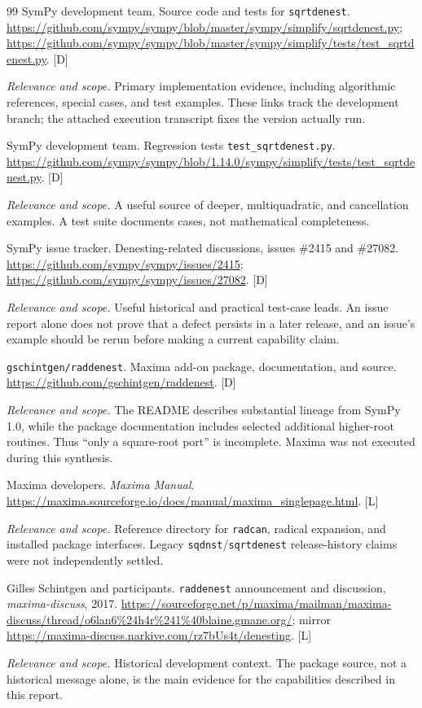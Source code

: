 \documentclass[11pt,oneside]{article}
\numberwithin{equation}{section}
\theoremstyle{definition}
\theoremstyle{remark}
\newcommand{\status}[1]{\textsf{\small[#1]}}
\newcommand{\entrynote}[1]{\par\smallskip\noindent\emph{Relevance and scope.} #1}
\begin{document}
\begin{thebibliography}{99}
SymPy development team. Source code and tests for \texttt{sqrtdenest}. \url{https://github.com/sympy/sympy/blob/master/sympy/simplify/sqrtdenest.py}; \url{https://github.com/sympy/sympy/blob/master/sympy/simplify/tests/test_sqrtdenest.py}. \status{D}
\entrynote{Primary implementation evidence, including algorithmic references, special cases, and test examples. These links track the development branch; the attached execution transcript fixes the version actually run.}

SymPy development team. Regression tests \texttt{test\_sqrtdenest.py}. \url{https://github.com/sympy/sympy/blob/1.14.0/sympy/simplify/tests/test_sqrtdenest.py}. \status{D}
\entrynote{A useful source of deeper, multiquadratic, and cancellation examples. A test suite documents cases, not mathematical completeness.}

SymPy issue tracker. Denesting-related discussions, issues \#2415 and \#27082. \url{https://github.com/sympy/sympy/issues/2415}; \url{https://github.com/sympy/sympy/issues/27082}. \status{D}
\entrynote{Useful historical and practical test-case leads. An issue report alone does not prove that a defect persists in a later release, and an issue's example should be rerun before making a current capability claim.}

\texttt{gschintgen/raddenest}. Maxima add-on package, documentation, and source. \url{https://github.com/gschintgen/raddenest}. \status{D}
\entrynote{The README describes substantial lineage from SymPy 1.0, while the package documentation includes selected additional higher-root routines. Thus ``only a square-root port'' is incomplete. Maxima was not executed during this synthesis.}

Maxima developers. \emph{Maxima Manual}. \url{https://maxima.sourceforge.io/docs/manual/maxima_singlepage.html}. \status{L}
\entrynote{Reference directory for \texttt{radcan}, radical expansion, and installed package interfaces. Legacy \texttt{sqdnst}/\texttt{sqrtdenest} release-history claims were not independently settled.}

Gilles Schintgen and participants. \texttt{raddenest} announcement and discussion, \emph{maxima-discuss}, 2017. \url{https://sourceforge.net/p/maxima/mailman/maxima-discuss/thread/o6lan6\%24h4r\%241\%40blaine.gmane.org/}; mirror \url{https://maxima-discuss.narkive.com/rz7bUs4t/denesting}. \status{L}
\entrynote{Historical development context. The package source, not a historical message alone, is the main evidence for the capabilities described in this report.}


\end{thebibliography}
\end{document}
